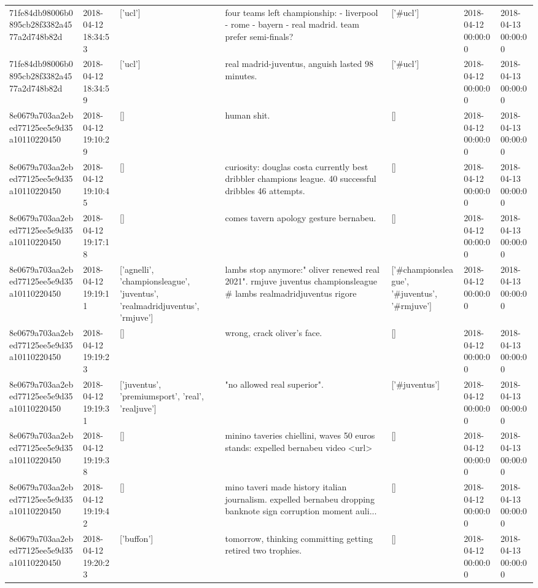 \begin{tabular}{lllllll}
71fe84db98006b0895cb28f3382a4577a2d748b82d & 2018-04-12 18:34:53 & ['ucl'] & four teams left championship: - liverpool - rome - bayern - real madrid. team prefer semi-finals? & ['#ucl'] & 2018-04-12 00:00:00 & 2018-04-13 00:00:00 \\
71fe84db98006b0895cb28f3382a4577a2d748b82d & 2018-04-12 18:34:59 & ['ucl'] & real madrid-juventus, anguish lasted 98 minutes. & ['#ucl'] & 2018-04-12 00:00:00 & 2018-04-13 00:00:00 \\
8e0679a703aa2ebed77125ee5e9d35a10110220450 & 2018-04-12 19:10:29 & [] & human shit. & [] & 2018-04-12 00:00:00 & 2018-04-13 00:00:00 \\
8e0679a703aa2ebed77125ee5e9d35a10110220450 & 2018-04-12 19:10:45 & [] & curiosity: douglas costa currently best dribbler champions league. 40 successful dribbles 46 attempts. & [] & 2018-04-12 00:00:00 & 2018-04-13 00:00:00 \\
8e0679a703aa2ebed77125ee5e9d35a10110220450 & 2018-04-12 19:17:18 & [] & comes tavern apology gesture bernabeu. & [] & 2018-04-12 00:00:00 & 2018-04-13 00:00:00 \\
8e0679a703aa2ebed77125ee5e9d35a10110220450 & 2018-04-12 19:19:11 & ['agnelli', 'championsleague', 'juventus', 'realmadridjuventus', 'rmjuve'] & lambs stop anymore:" oliver renewed real 2021". rmjuve juventus championsleague \# lambs realmadridjuventus rigore & ['#championsleague', '#juventus', '#rmjuve'] & 2018-04-12 00:00:00 & 2018-04-13 00:00:00 \\
8e0679a703aa2ebed77125ee5e9d35a10110220450 & 2018-04-12 19:19:23 & [] & wrong, crack oliver's face. & [] & 2018-04-12 00:00:00 & 2018-04-13 00:00:00 \\
8e0679a703aa2ebed77125ee5e9d35a10110220450 & 2018-04-12 19:19:31 & ['juventus', 'premiumsport', 'real', 'realjuve'] & "no allowed real superior". & ['#juventus'] & 2018-04-12 00:00:00 & 2018-04-13 00:00:00 \\
8e0679a703aa2ebed77125ee5e9d35a10110220450 & 2018-04-12 19:19:38 & [] & minino taveries chiellini, waves 50 euros stands: expelled bernabeu video <url> & [] & 2018-04-12 00:00:00 & 2018-04-13 00:00:00 \\
8e0679a703aa2ebed77125ee5e9d35a10110220450 & 2018-04-12 19:19:42 & [] & mino taveri made history italian journalism. expelled bernabeu dropping banknote sign corruption moment auli... & [] & 2018-04-12 00:00:00 & 2018-04-13 00:00:00 \\
8e0679a703aa2ebed77125ee5e9d35a10110220450 & 2018-04-12 19:20:23 & ['buffon'] & tomorrow, thinking committing getting retired two trophies. & [] & 2018-04-12 00:00:00 & 2018-04-13 00:00:00 \\

\end{tabular}

